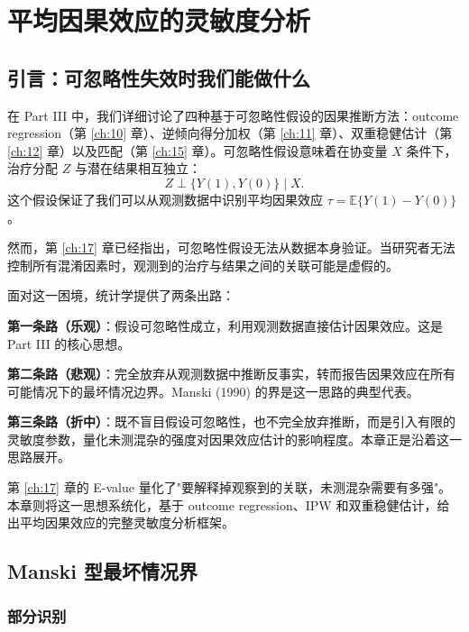 
\chapter{平均因果效应的灵敏度分析}\label{ch:18}

\section{引言：可忽略性失效时我们能做什么}\label{sec:18-intro}

在 Part III 中，我们详细讨论了四种基于可忽略性假设的因果推断方法：outcome regression（第 \ref{ch:10} 章）、逆倾向得分加权（第 \ref{ch:11} 章）、双重稳健估计（第 \ref{ch:12} 章）以及匹配（第 \ref{ch:15} 章）。可忽略性假设意味着在协变量 $X$ 条件下，治疗分配 $Z$ 与潜在结果相互独立：
\[
Z \perp \{Y(1), Y(0)\} \mid X .
\]
这个假设保证了我们可以从观测数据中识别平均因果效应 $\tau = \mathbb{E}\{Y(1) - Y(0)\}$。

然而，第 \ref{ch:17} 章已经指出，可忽略性假设无法从数据本身验证。当研究者无法控制所有混淆因素时，观测到的治疗与结果之间的关联可能是虚假的。

面对这一困境，统计学提供了两条出路：

\textbf{第一条路（乐观）}：假设可忽略性成立，利用观测数据直接估计因果效应。这是 Part III 的核心思想。

\textbf{第二条路（悲观）}：完全放弃从观测数据中推断反事实，转而报告因果效应在所有可能情况下的最坏情况边界。Manski (1990) 的界是这一思路的典型代表。

\textbf{第三条路（折中）}：既不盲目假设可忽略性，也不完全放弃推断，而是引入有限的灵敏度参数，量化未测混杂的强度对因果效应估计的影响程度。本章正是沿着这一思路展开。

第 \ref{ch:17} 章的 E-value 量化了"要解释掉观察到的关联，未测混杂需要有多强"。本章则将这一思想系统化，基于 outcome regression、IPW 和双重稳健估计，给出平均因果效应的完整灵敏度分析框架。

\section{Manski 型最坏情况界}\label{sec:18-manski-bounds}

\subsection{部分识别}\label{sec:18-partial-identification}

